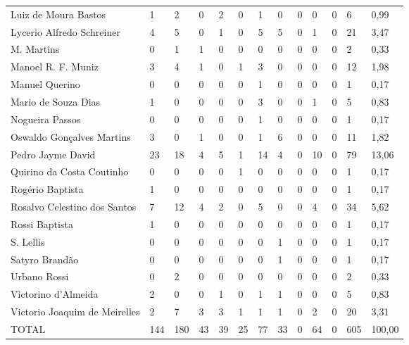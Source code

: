 \begin{table}[!htp]
{\begin{tabular}{lllllllllllll}
Luiz de Moura Bastos	&1	&2	&0	&2	&0	&1	&0	&0	&0	&0	&6	&0,99\\
Lycerio Alfredo Schreiner	&4	&5	&0	&1	&0	&5	&5	&0	&1	&0	&21	&3,47\\
M. Martins	&0	&1	&1	&0	&0	&0	&0	&0	&0	&0	&2	&0,33\\
Manoel R. F. Muniz	&3	&4	&1	&0	&1	&3	&0	&0	&0	&0	&12	&1,98\\
Manuel Querino	&0	&0	&0	&0	&0	&1	&0	&0	&0	&0	&1	&0,17\\
Mario de Souza Dias	&1	&0	&0	&0	&0	&3	&0	&0	&1	&0	&5	&0,83\\
Nogueira Passos	&0	&0	&0	&0	&0	&1	&0	&0	&0	&0	&1	&0,17\\
Oswaldo Gonçalves Martins	&3	&0	&1	&0	&0	&1	&6	&0	&0	&0	&11	&1,82\\
Pedro Jayme David	&23	&18	&4	&5	&1	&14	&4	&0	&10	&0	&79	&13,06\\
Quirino da Costa Coutinho	&0	&0	&0	&0	&1	&0	&0	&0	&0	&0	&1	&0,17\\
Rogério Baptista	&1	&0	&0	&0	&0	&0	&0	&0	&0	&0	&1	&0,17\\
Rosalvo Celestino dos Santos	&7	&12	&4	&2	&0	&5	&0	&0	&4	&0	&34	&5,62\\
Rossi Baptista	&1	&0	&0	&0	&0	&0	&0	&0	&0	&0	&1	&0,17\\
S. Lellis	&0	&0	&0	&0	&0	&0	&1	&0	&0	&0	&1	&0,17\\
Satyro Brandão	&0	&0	&0	&0	&0	&0	&1	&0	&0	&0	&1	&0,17\\
Urbano Rossi	&0	&2	&0	&0	&0	&0	&0	&0	&0	&0	&2	&0,33\\
Victorino d'Almeida	&2	&0	&0	&1	&0	&1	&1	&0	&0	&0	&5	&0,83\\
Victorio Joaquim de Meirelles	&2	&7	&3	&3	&1	&1	&1	&0	&2	&0	&20	&3,31\\
\midrule
TOTAL	&144	&180	&43	&39	&25	&77	&33	&0	&64	&0	&605	&100,00\\
\bottomrule
\end{tabular} 
}
{}
\end{table}
